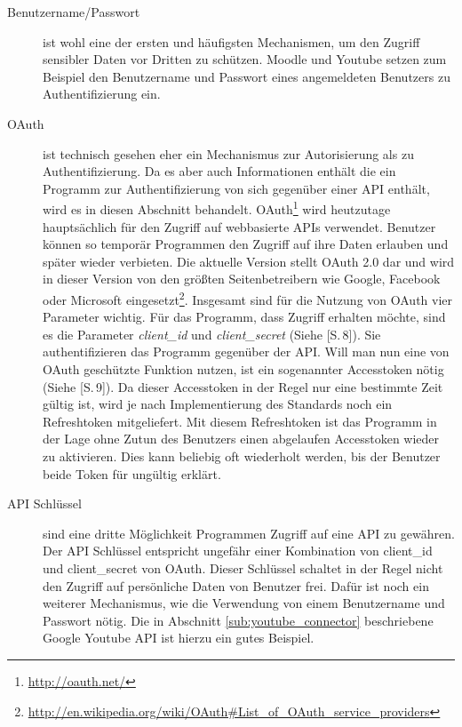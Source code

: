 \begin{description}
    \item[Benutzername/Passwort] ist wohl eine der ersten und häufigsten Mechanismen, um den Zugriff sensibler Daten vor Dritten zu schützen. Moodle und Youtube setzen zum Beispiel den Benutzername und Passwort eines angemeldeten Benutzers zu Authentifizierung ein.
    
    \item[OAuth] ist technisch gesehen eher ein Mechanismus zur Autorisierung als zu Authentifizierung. Da es aber auch Informationen enthält die ein Programm zur Authentifizierung von sich gegenüber einer API enthält, wird es in diesen Abschnitt behandelt. OAuth\footnote{\url{http://oauth.net/}} wird heutzutage hauptsächlich für den Zugriff auf webbasierte APIs verwendet. Benutzer können so temporär Programmen den Zugriff auf ihre Daten erlauben und später wieder verbieten. Die aktuelle Version stellt OAuth 2.0 dar und wird in dieser Version von den größten Seitenbetreibern wie Google, Facebook oder Microsoft eingesetzt\footnote{\url{http://en.wikipedia.org/wiki/OAuth\#List\_of\_OAuth\_service\_providers}}. Insgesamt sind für die Nutzung von OAuth vier Parameter wichtig. Für das Programm, dass Zugriff erhalten möchte, sind es die Parameter \emph{client\_id} und \emph{client\_secret} (Siehe \cite{rfc6749}[S.\,8]). Sie authentifizieren das Programm gegenüber der API. Will man nun eine von OAuth geschützte Funktion nutzen, ist ein sogenannter Accesstoken nötig (Siehe \cite{rfc6749}[S.\,9]). Da dieser Accesstoken in der Regel nur eine bestimmte Zeit gültig ist, wird je nach Implementierung des Standards noch ein Refreshtoken mitgeliefert. Mit diesem Refreshtoken ist das Programm in der Lage ohne Zutun des Benutzers einen abgelaufen Accesstoken wieder zu aktivieren. Dies kann beliebig oft wiederholt werden, bis der Benutzer beide Token für ungültig erklärt. 
    
    \item[API Schlüssel] sind eine dritte Möglichkeit Programmen Zugriff auf eine API zu gewähren. Der API Schlüssel entspricht ungefähr einer Kombination von client\_id und client\_secret von OAuth. Dieser Schlüssel schaltet in der Regel nicht den Zugriff auf persönliche Daten von Benutzer frei. Dafür ist noch ein weiterer Mechanismus, wie die Verwendung von einem Benutzername und Passwort nötig. Die in Abschnitt \ref{sub:youtube_connector}  beschriebene Google Youtube API ist hierzu ein gutes Beispiel.
\end{description}

